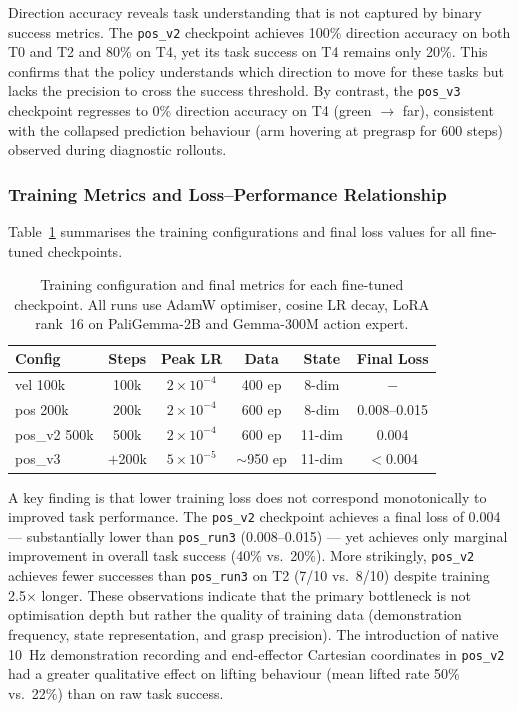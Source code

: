 Direction accuracy reveals task understanding that is not captured by binary
success metrics.
The \texttt{pos\_v2} checkpoint achieves 100\% direction accuracy on both T0
and T2 and 80\% on T4, yet its task success on T4 remains only 20\%.
This confirms that the policy understands which direction to move for these tasks
but lacks the precision to cross the success threshold.
By contrast, the \texttt{pos\_v3} checkpoint regresses to 0\% direction
accuracy on T4 (green $\to$ far), consistent with the collapsed prediction
behaviour (arm hovering at pregrasp for 600 steps) observed during diagnostic
rollouts.

\subsubsection{Training Metrics and Loss--Performance Relationship}

Table~\ref{tab:training} summarises the training configurations and final
loss values for all fine-tuned checkpoints.

\begin{table}[t]
\centering
\caption{Training configuration and final metrics for each fine-tuned checkpoint.
All runs use AdamW optimiser, cosine LR decay, LoRA rank~16 on PaliGemma-2B
and Gemma-300M action expert.}
\label{tab:training}
\small
\begin{tabular}{@{}lccccc@{}}
\toprule
\textbf{Config} & \textbf{Steps} & \textbf{Peak LR} & \textbf{Data} &
    \textbf{State} & \textbf{Final Loss} \\
\midrule
vel 100k   & 100k & $2\!\times\!10^{-4}$ & 400 ep & 8-dim & $-$ \\
pos 200k   & 200k & $2\!\times\!10^{-4}$ & 600 ep & 8-dim & 0.008--0.015 \\
pos\_v2 500k & 500k & $2\!\times\!10^{-4}$ & 600 ep & 11-dim & 0.004 \\
pos\_v3    & $+$200k & $5\!\times\!10^{-5}$ & $\sim$950 ep & 11-dim & $<$0.004 \\
\bottomrule
\end{tabular}
\end{table}

A key finding is that lower training loss does not correspond monotonically to
improved task performance.
The \texttt{pos\_v2} checkpoint achieves a final loss of 0.004 --- substantially
lower than \texttt{pos\_run3} (0.008--0.015) --- yet achieves only marginal
improvement in overall task success (40\% vs.\ 20\%).
More strikingly, \texttt{pos\_v2} achieves fewer successes than
\texttt{pos\_run3} on T2 (7/10 vs.\ 8/10) despite training 2.5$\times$ longer.
These observations indicate that the primary bottleneck is not optimisation
depth but rather the quality of training data (demonstration frequency,
state representation, and grasp precision).
The introduction of native 10~Hz demonstration recording and end-effector
Cartesian coordinates in \texttt{pos\_v2} had a greater qualitative effect
on lifting behaviour (mean lifted rate 50\% vs.\ 22\%) than on raw task success.

